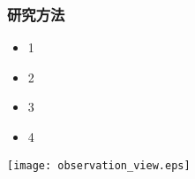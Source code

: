 \documentclass[utf8x]{beamer}
\begin{document}


 \begin{frame}%
 \frametitle{研究方法}
 \begin{itemize}
 \setlength{\itemindent}{1em}
 \item[] 1
 \item[] 2
 \item[] 3
 \item[] 4
 \end{itemize}
 \begin{center}
 \texttt{[image: observation\_view.eps]}
 \end{center}
 \end{frame}
\end{document}
